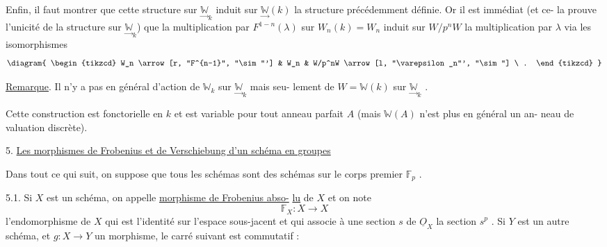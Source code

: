 Enfin, il faut montrer que cette structure sur $\underset{\rightarrow}{\mathbb{W}}_k$ induit
sur $\underset{\rightarrow}{\mathbb{W}}(k)$ la structure précédemment définie. Or il est immédiat (et ce-%
la prouve l'unicité de la structure sur $\underset{\rightarrow}{\mathbb{W}}_k$) que la multiplication par
$F^{1-n}(\lambda)$ sur $W_n(k) = W_n$ induit sur $W/p^nW$ la multiplication par $\lambda$
via les isomorphismes
\[
\diagram{
\begin{tikzcd}
W_n \arrow[r, "F^{n-1}", "\sim"'] & W_n & W/p^nW \arrow[l, "\varepsilon_n"', "\sim"] \ .
\end{tikzcd}
}
\]

\uline{Remarque}. Il n'y a pas en général d'action de $\mathbb{W}_k$ sur $\underset{\rightarrow}{\mathbb{W}}_k$ mais seu-%
lement de $W = \mathbb{W}(k)$ sur $\underset{\rightarrow}{\mathbb{W}}_k$ .

Cette construction est fonctorielle en $k$ et est variable
pour tout anneau parfait $A$ (mais $\mathbb{W}(A)$ n'est plus en général un an-%
neau de valuation discrète).

5. \uline{Les morphismes de Frobenius et de Verschiebung d'un schéma en groupes}

Dans tout ce qui suit, on suppose que tous les schémas sont
des schémas sur le corps premier $\mathbb{F}_p$ .

5.1. Si $X$ est un schéma, on appelle \uline{morphisme de Frobenius abso-}%
\uline{lu} de $X$ et on note
\[
\mathbb{F}_X : X \rightarrow X
\]
l'endomorphisme de $X$ qui est l'identité sur l'espace sous-jacent et qui
associe à une section $s$ de $\underline{O}_X$ la section $s^p$ . Si $Y$ est un autre
schéma, et $g : X \rightarrow Y$ un morphisme, le carré suivant est commutatif :

